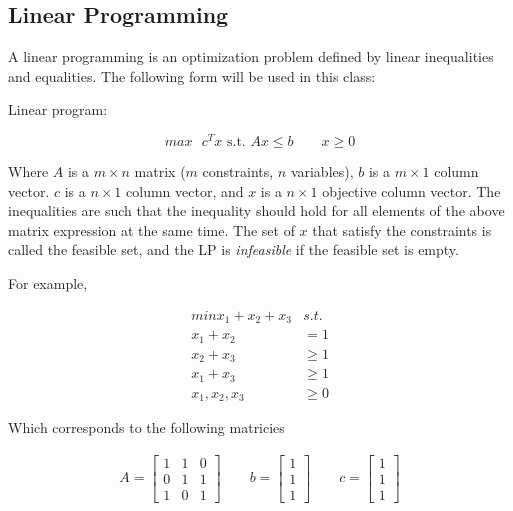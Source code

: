 \documentclass[../notes.tex]{subfiles}
\begin{document}
\subsection{Linear Programming}


A linear programming is an optimization problem defined by linear inequalities and equalities. The following form will be used in this class:


\begin{definition}
    Linear program:

    \begin{equation}
        max \text{  }c^T x \text{ s.t. } Ax \le  b \qquad x \ge 0
    \end{equation}

    Where $ A  $ is a $ m\times  n $ matrix ($ m $ constraints, $ n $ variables), $ b $ is a $ m \times  1$ column vector. $ c $ is a $ n \times  1 $ column vector, and $ x $ is a $ n \times  1 $ objective column vector. The inequalities are such that the inequality should hold for all elements of the above matrix expression at the same time.
    The set of $ x $ that satisfy the constraints is called the feasible set, and the LP is \textit{infeasible} if the feasible set is empty.
    
\end{definition}

For example,

\begin{equation}
    \begin{split}
        min x_1 + x_2 + x_3 & s.t. \\
         x_1 + x_2 &= 1  \\
         x_2 + x_3&\ge  1 \\
         x_1 + x_3 &\ge  1 \\
         x_1, x_2, x_3 &\ge  0
    \end{split}
\end{equation}

Which corresponds to the following matricies

\begin{equation}
    \begin{split}
        A = \begin{bmatrix}
            1 & 1 & 0 \\
            0 & 1 & 1 \\
            1 & 0 & 1
        \end{bmatrix} \qquad b = \begin{bmatrix}
            1 \\
            1 \\
            1
        \end{bmatrix} \qquad c = \begin{bmatrix}
            1 \\
            1 \\
            1
        \end{bmatrix}
    \end{split}
    \label{eq:lp1}
\end{equation}
\end{document}
